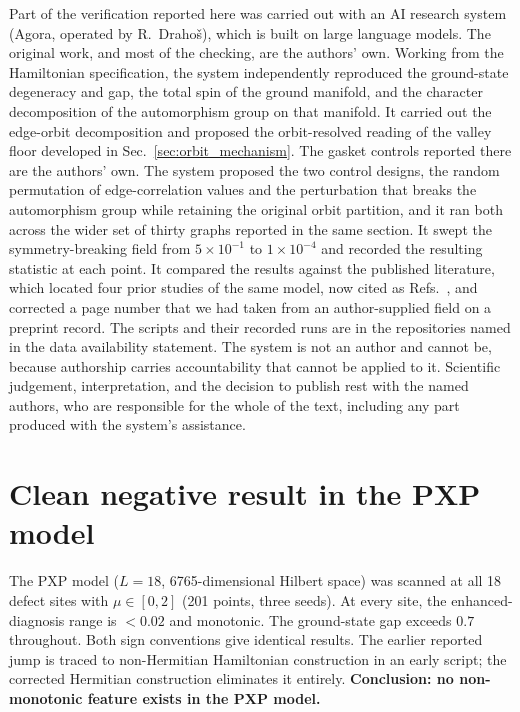 \documentclass[pdflatex,sn-mathphys-num,iicol]{sn-jnl}
\begin{document}
Part of the verification reported here was carried out with an AI research system (Agora, operated by R.~Draho\v{s}), which is built on large language models. The original work, and most of the checking, are the authors' own. Working from the Hamiltonian specification, the system independently reproduced the ground-state degeneracy and gap, the total spin of the ground manifold, and the character decomposition of the automorphism group on that manifold. It carried out the edge-orbit decomposition and proposed the orbit-resolved reading of the valley floor developed in Sec.~\ref{sec:orbit_mechanism}. The gasket controls reported there are the authors' own. The system proposed the two control designs, the random permutation of edge-correlation values and the perturbation that breaks the automorphism group while retaining the original orbit partition, and it ran both across the wider set of thirty graphs reported in the same section. It swept the symmetry-breaking field from $5\times10^{-1}$ to $1\times10^{-4}$ and recorded the resulting statistic at each point. It compared the results against the published literature, which located four prior studies of the same model, now cited as Refs.~\cite{Voigt1998,Voigt2001,Voigt2004,Zou2023}, and corrected a page number that we had taken from an author-supplied field on a preprint record. The scripts and their recorded runs are in the repositories named in the data availability statement. The system is not an author and cannot be, because authorship carries accountability that cannot be applied to it. Scientific judgement, interpretation, and the decision to publish rest with the named authors, who are responsible for the whole of the text, including any part produced with the system's assistance.

\section{Clean negative result in the PXP model}

The PXP model ($L=18$, 6765-dimensional Hilbert space) was scanned at all 18 defect sites with $\mu\in[0,2]$ (201 points, three seeds). At every site, the enhanced-diagnosis range is $<0.02$ and monotonic. The ground-state gap exceeds $0.7$ throughout. Both sign conventions give identical results. The earlier reported jump is traced to non-Hermitian Hamiltonian construction in an early script; the corrected Hermitian construction eliminates it entirely. \textbf{Conclusion: no non-monotonic feature exists in the PXP model.}
\end{document}
